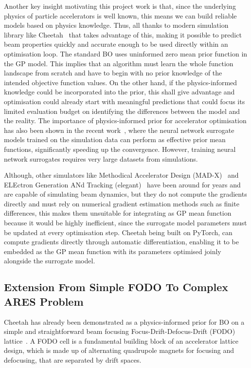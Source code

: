 Another key insight motivating this project work is that, since the underlying physics of particle accelerators is well known,
this means we can build reliable models based on physics knowledge. Thus, all thanks to modern simulation library like Cheetah~\cite{kaiser2024bridging} that takes advantage of this,
making it possible to predict beam properties quickly and accurate enough to be used directly within an optimisation loop. The standard BO uses uninformed zero mean prior function in the GP model. This implies that an algorithm must learn the whole function landscape from scratch and have to begin with no prior knowledge of the intended objective 
function values. On the other hand, if the physics-informed knowledge could be incorporated into the prior, this shall give advantage 
and optimisation could already start with meaningful predictions that could focus its limited evaluation budget on identifying the 
differences between the model and the reality. The importance of physics-informed prior for accelerator optimisation has also been 
shown in the recent work~\cite{boltz2025priormeanmodule}, where the neural network surrogate models trained on the simulation data can perform as effective prior 
mean functions, significantly speeding up the convergence. However, training neural network surrogates requires very large datasets 
from simulations. \

Although, other simulators like Methodical Accelerator Design (MAD-X)~\cite{madx2023} and ELEctron Generation ANd Tracking (elegant)~\cite{elegant2000} have been around for years and are capable of simulating beam dynamics, 
but they do not compute the gradients directly and must rely on numerical gradient estimation methods such as finite differences, this makes them unsuitable for 
integrating as GP mean function because it would be highly inefficient, since the surrogate model parameters must be updated at every optimisation step. Cheetah being built on PyTorch, can compute gradients
directly through automatic differentiation, enabling it to be embedded as the GP mean function with its parameters optimised joinly alongside the
surrogate model.



\subsection{Extension From Simple FODO To Complex ARES Problem}

Cheetah has already been demonstrated as a physics-informed prior for BO on a simple and straightforward beam focusing Focus-Drift-Defocus-Drift 
(FODO) lattice~\cite{kaiser2024bridging}. A FODO cell is a fundamental building block of an accelerator lattice design, which is made up of alternating quadrupole magnets 
for focusing and defocusing, that are separated by drift spaces. \

